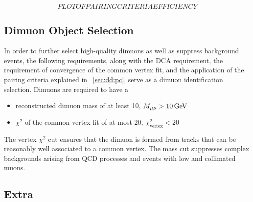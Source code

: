 $$PLOT OF PAIRING CRITERIA EFFICIENCY$$

\subsection{Dimuon Object Selection}
In order to further select high-quality dimuons as well as suppress background events, the following requirements, along with the DCA requirement, the requirement of convergence of the common vertex fit, and the application of the pairing criteria explained in \Sec~\ref{sec:dd:pc}, serve as a dimuon identification selection.
Dimuons are required to have a
\begin{itemize}
  \item reconstructed dimuon mass of at least 10\GeV, \ie $M_{\mu\mu} > 10\,\text{Ge\hspace{-.08em}V}$
  \item $\chi^2$ of the common vertex fit of at most 20, \ie $\chi^2_\text{vertex} < 20$
\end{itemize}

The vertex $\chi^2$ cut ensures that the dimuon is formed from tracks that can be reasonably well associated to a common vertex.
The mass cut suppresses complex backgrounds arising from QCD processes and events with low \pT and collimated muons.

\subsection{Extra}

